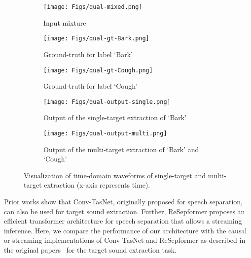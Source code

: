\begin{figure}[t!]
\centering
\begin{subfigure}[l]{\linewidth}
    \texttt{[image: Figs/qual-mixed.png]}
    \caption{Input mixture}
    \label{fig:qual_mixture}
\end{subfigure}
\centering
\begin{subfigure}[l]{\linewidth}
    \texttt{[image: Figs/qual-gt-Bark.png]}
    \caption{Ground-truth for label `Bark'}
    \label{fig:qual_gt_bark}
\end{subfigure}
\centering
\begin{subfigure}[l]{\linewidth}
    \texttt{[image: Figs/qual-gt-Cough.png]}
    \caption{Ground-truth for label `Cough'}
    \label{fig:qual_gt_cough}
\end{subfigure}
\centering
\begin{subfigure}[l]{\linewidth}
    \texttt{[image: Figs/qual-output-single.png]}
    \caption{Output of the single-target extraction of `Bark'}
    \label{fig:qual_output_single}
\end{subfigure}
\centering
\begin{subfigure}[l]{\linewidth}
    \texttt{[image: Figs/qual-output-multi.png]}
    \caption{Output of the multi-target extraction of `Bark' and `Cough'}
    \label{fig:qual_output_multi}
\end{subfigure}
\caption{{Visualization of time-domain waveforms of single-target and multi-target extraction (x-axis represents time). }}
\label{fig:qual}
\vskip -0.2in
\end{figure}

\vskip 0.05in Prior works \cite{2020arXiv200605712O, delcroix2022soundbeam} show that Conv-TasNet,   originally proposed for speech separation, can also be used for target sound extraction. Further,   ReSepformer proposes an efficient transformer architecture for speech separation that allows a streaming inference. Here, we compare the performance of our architecture  with the causal or streaming implementations of Conv-TasNet and ReSepformer as described in the original papers~\cite{luo2019conv,subakan2022resource} for the  target sound extraction task. 




